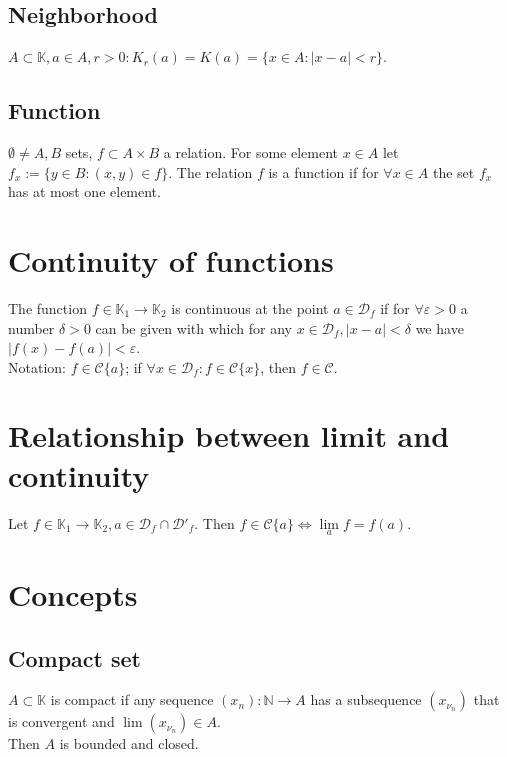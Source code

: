 \documentclass[margin=0px]{article}
\begin{document}
\subsection{Neighborhood}

$A \subset \mathbb{K}, a \in A, r > 0: K_{r}(a) = K(a) = \{x \in A: |x-a| < r\}$.

\subsection{Function}

$\emptyset \neq A, B$ sets, $f \subset A \times B$ a relation. For some element $x \in A$ let $f_{x} := \{y \in B: (x,y) \in f\}$. The relation $f$ is a function if for $\forall x \in A$ the set $f_{x}$ has at most one element.

\section{Continuity of functions}

The function $f \in \mathbb{K}_{1} \to \mathbb{K}_{2}$ is continuous at the point $a \in \mathcal{D}_{f}$ if for $\forall \varepsilon > 0$ a number $\delta > 0$ can be given with which for any $x \in \mathcal{D}_{f}, |x-a| < \delta$ we have $|f(x)-f(a)| < \varepsilon$. \\
Notation: $f \in \mathcal{C}\{a\}$; if $\forall x \in \mathcal{D}_{f} : f \in \mathcal{C}\{x\}$, then $f \in \mathcal{C}$.

\section{Relationship between limit and continuity}

Let $f \in \mathbb{K}_{1} \to \mathbb{K}_{2}, a \in \mathcal{D}_{f} \cap \mathcal{D}'_{f}$. Then $f \in \mathcal{C}\{a\} \iff \lim\limits_{a}{f} = f(a)$.

\section{Concepts}

\subsection{Compact set}

$A \subset \mathbb{K}$ is compact if any sequence $(x_{n}): \mathbb{N} \to A$ has a subsequence $(x_{\nu_{n}})$ that is convergent and $\lim{(x_{\nu_{n}})} \in A$. \\
Then $A$ is bounded and closed.
\end{document}
